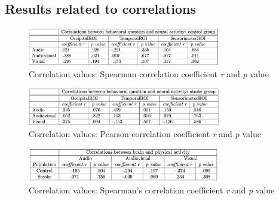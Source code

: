 \clearpage
\subsection*{Results related to correlations}
\begin{figure}[H]
    \centering
    \includegraphics[width=0.75\textwidth]{scatter_plots/correlation_q2_control.png}
    \caption{Correlation values: Spearman correlation coefficient \textit{r} and \textit{p} value}
    \label{fig: correlation values q2: control} 
\end{figure}

\begin{figure}[H]
    \centering
    \includegraphics[width=0.75\textwidth]{scatter_plots/correlation_q2_stroke.png}
    \caption{Correlation values: Pearson correlation coefficient \textit{r} and \textit{p} value}
    \label{fig: correlation values q2: stroke} 
\end{figure}

\begin{figure}[H]
    \centering
    \includegraphics[width=0.75\textwidth]{significance_tables/correlation_activeq_.png}
    \caption{Correlation values: Spearman's correlation coefficient \textit{r} and \textit{p} value}
    \label{fig: significance correlation activeq} 
\end{figure}

